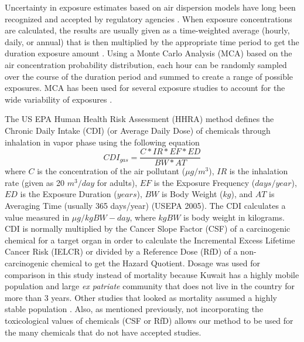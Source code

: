 Uncertainty in exposure estimates based on air dispersion models have long been recognized and accepted by regulatory agencies \citep{Colvile2002, Fox1984}.  When exposure concentrations are calculated, the results are usually given as a time-weighted average (hourly, daily, or annual) that is then multiplied by the appropriate time period to get the duration exposure amount \citep{Zhang2013}. Using a Monte Carlo Analysis (MCA) based on the air concentration probability distribution, each hour can be randomly sampled over the course of the duration period and summed to create a range of possible exposures.  MCA has been used for several exposure studies to account for the wide variability of exposures \citep{Gerharz2013, Tan2014}.

The US EPA Human Health Risk Assessment (HHRA) method defines the Chronic Daily Intake (CDI) (or Average Daily Dose) of chemicals through inhalation in vapor phase using the following equation
%
\begin{equation}
\label{eq1:cdi_gas}
CDI_{gas} = \frac{C*IR*EF*ED}{BW*AT}
\end{equation}
%
\noindent
where $C$ is the concentration of the air pollutant ($\mu g/m^{3}$), $IR$ is the inhalation rate (given as 20 $m^{3}/day$ for adults), $EF$ is the Exposure Frequency ($days/year$), $ED$ is the Exposure Duration ($years$), $BW$ is Body Weight ($kg$), and $AT$ is Averaging Time (usually 365 days/year) (USEPA 2005).  The CDI calculates a value measured in $\mu g/kgBW-day$, where $kgBW$ is body weight in kilograms. CDI is normally multiplied by the Cancer Slope Factor (CSF) of a carcinogenic chemical for a target organ in order to calculate the Incremental Excess Lifetime Cancer Risk (IELCR) or divided by a Reference Dose (RfD) of a non-carcinogenic chemical to get the Hazard Quotient. Dosage was used for comparison in this study instead of mortality because Kuwait has a highly mobile population and large \textit{ex patriate} community that does not live in the country for more than 3 years. 
Other studies that looked as mortality assumed a highly stable population \citep{Sanhueza2010}. Also, as mentioned previously, not incorporating the toxicological values of chemicals (CSF or RfD) allows our method to be used for the many chemicals that do not have accepted studies.

